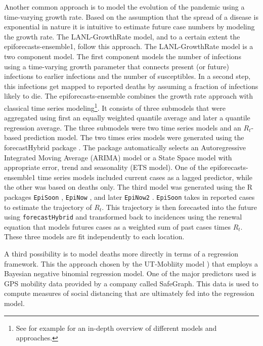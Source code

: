 \documentclass[
]{book}
\begin{document}
Another common approach is to model the evolution of the pandemic using a time-varying growth rate. Based on the assumption that the spread of a disease is exponential in nature it is intuitive to estimate future case numbers by modeling the growth rate. The LANL-GrowthRate model, and to a certain extent the epiforecasts-ensemble1, follow this approach. The LANL-GrowthRate model is a two component model. The first component models the number of infections using a time-varying growth parameter that connects present (or future) infections to earlier infections and the number of susceptibles. In a second step, this infections get mapped to reported deaths by assuming a fraction of infections likely to die. The epiforecasts-ensemble combines the growth rate approach with classical time series modeling\footnote{See for example \citet{hyndmanrobjForecastingPrinciplesPractice2019} for an in-depth overview of different models and approaches.}. It consists of three submodels that were aggregated using first an equally weighted quantile average and later a quantile regression average. The three submodels were two time series models and an \(R_t\)-based prediction model. The two times eries models were generated using the forecastHybrid package \citep{R-forecastHybrid}. The package automatically selects an Autoregressive Integrated Moving Average (ARIMA) model or a State Space model with appropriate error, trend and seasonality (ETS model). One of the epiforecasts-ensemble1 time series models included current cases as a lagged predictor, while the other was based on deaths only. The third model was generated using the R packages \texttt{EpiSoon} \citep{R-EpiSoon}, \texttt{EpiNow} \citep{R-EpiNow}, and later \texttt{EpiNow2} \citep{R-EpiNow2}. \texttt{EpiSoon} takes in reported cases to estimate the trajectory of \(R_t\). This trajectory is then forecasted into the future using \texttt{forecastHybrid} and transformed back to incidences using the renewal equation \citet{coriNewFrameworkSoftware2013} that models futures cases as a weighted sum of past cases times \(R_t\). These three models are fit independently to each location.

A third possibility is to model deaths more directly in terms of a regression framework. This the approach chosen by the UT-Mobliity model \citep{woodyProjectionsFirstwaveCOVID192020}) that employs a Bayesian negative binomial regression model. One of the major predictors used is GPS mobility data provided by a company called SafeGraph. This data is used to compute measures of social distancing that are ultimately fed into the regression model.
\end{document}
